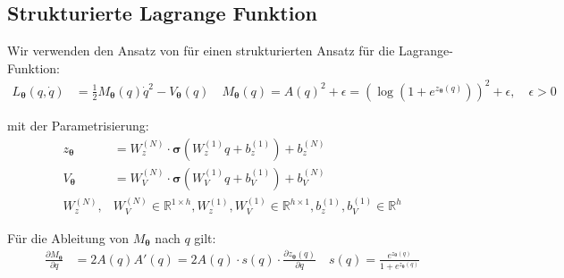 \documentclass[a4paper, 12pt]{scrartcl}
\begin{document}
\begin{algorithm*}
\end{algorithm*}

\subsection{Strukturierte Lagrange Funktion}

Wir verwenden den Ansatz von \cite{Lutter} für einen strukturierten Ansatz 
für die Lagrange-Funktion:
%
\begin{align*}
    L_{\bm{\theta}}(q,\dot{q})
    &=
    \frac{1}{2} M_{\bm{\theta}}(q) \dot{q}^2 - V_{\bm{\theta}}(q)
    \quad
    M_{\bm{\theta}}(q) 
    = 
    A(q)^2 
    +
    \epsilon
    =
    \left(
        \log\left(1 + e^{z_{\bm{\theta}}(q)} \right)
    \right)^2
    + \epsilon,
    \quad
    \epsilon > 0 
\end{align*}

mit der Parametrisierung:
\begin{align*}
    z_{\bm{\theta}} 
    &= W^{(N)}_z \cdot \bm{\sigma}\left(W^{(1)}_z q + b_z^{(1)}\right) + b_z^{(N)}
    \\
    V_{\bm{\theta}} 
    &= W^{(N)}_V \cdot \bm{\sigma}\left(W^{(1)}_V q + b_V^{(1)}\right) + b_V^{(N)}
    \\
    W^{(N)}_z ,& W^{(N)}_V \in \mathbb{R}^{1 \times h}, W^{(1)}_z , 
    W^{(1)}_V \in \mathbb{R}^{h \times 1} ,
    b_z^{(1)} , b_V^{(1)} \in \mathbb{R}^{h} 
\end{align*}

Für die Ableitung von $M_{\bm{\theta}}$ nach $q$ gilt:
\begin{align*}
    \frac{\partial M_{\bm{\theta}}}{\partial q}
    &=
    2A(q) A'(q)
    =
    2A(q) \cdot s(q) \cdot 
    \frac{\partial z_{\bm{\theta}}(q)}{\partial q} 
    \quad
    s(q)
    =
    \frac{e^{z_{\bm{\theta}}(q)}}{1 + e^{z_{\bm{\theta}}(q)}}
\end{align*}
\end{document}
